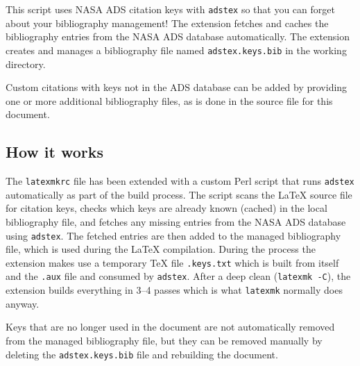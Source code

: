 This script uses NASA ADS citation keys with \texttt{adstex} so that you can forget about your bibliography management! The extension fetches and caches the bibliography entries from the NASA ADS database automatically. The extension creates and manages a bibliography file named \texttt{adstex.keys.bib} in the working directory. 

Custom citations with keys not in the ADS database can be added by providing one or more additional bibliography files, as is done in the source file for this document.

\subsection*{How it works}
The \texttt{latexmkrc} file has been extended with a custom Perl script that runs \texttt{adstex} automatically as part of the build process. The script scans the LaTeX source file for citation keys, checks which keys are already known (cached) in the local bibliography file, and fetches any missing entries from the NASA ADS database using \texttt{adstex}. The fetched entries are then added to the managed bibliography file, which is used during the LaTeX compilation. During the process the extension makes use a temporary TeX file \texttt{.keys.txt} which is built from itself and the \texttt{.aux} file and consumed by \texttt{adstex}. After a deep clean (\texttt{latexmk -C}), the extension builds everything in 3--4 passes which is what \texttt{latexmk} normally does anyway. 

Keys that are no longer used in the document are not automatically removed from the managed bibliography file, but they can be removed manually by deleting the \texttt{adstex.keys.bib} file and rebuilding the document.
